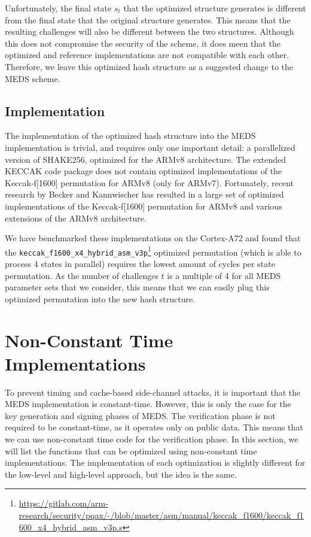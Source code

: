 \documentclass[11pt,a4paper]{report}
\theoremstyle{definition}
\begin{document}
Unfortunately, the final state $s_t$ that the optimized structure generates is different from the final state that the original structure generates. This means that the resulting challenges will also be different between the two structures. Although this does not compromise the security of the scheme, it does meen that the optimized and reference implementations are not compatible with each other. Therefore, we leave this optimized hash structure as a suggested change to the MEDS scheme.

\subsection{Implementation}
The implementation of the optimized hash structure into the MEDS implementation is trivial, and requires only one important detail: a parallelized version of SHAKE256, optimized for the ARMv8 architecture. The extended KECCAK code package \cite{xkcp} does not contain optimized implementations of the Keccak-f[1600] permutation for ARMv8 (only for ARMv7). Fortunately, recent research by Becker and Kannwischer \cite{becker2022hybrid} has resulted in a large set of optimized implementations of the Keccak-f[1600] permutation for ARMv8 and various extensions of the ARMv8 architecture.

We have benchmarked these implementations on the Cortex-A72 and found that the \texttt{keccak\_f1600\_x4\_hybrid\_asm\_v3p}\footnote{\url{https://gitlab.com/arm-research/security/pqax/-/blob/master/asm/manual/keccak\_f1600/keccak\_f1600\_x4\_hybrid\_asm\_v3p.s}} optimized permutation (which is able to process 4 states in parallel) requires the lowest amount of cycles per state permutation. As the number of challenges $t$ is a multiple of 4 for all MEDS parameter sets that we consider, this means that we can easily plug this optimized permutation into the new hash structure.

\section{Non-Constant Time Implementations}
\label{sec:nonconstanttime}
To prevent timing and cache-based side-channel attacks, it is important that the MEDS implementation is constant-time. However, this is only the case for the key generation and signing phases of MEDS. The verification phase is not required to be constant-time, as it operates only on public data. This means that we can use non-constant time code for the verification phase. In this section, we will list the functions that can be optimized using non-constant time implementations. The implementation of each optimization is slightly different for the low-level and high-level approach, but the idea is the same.
\end{document}
